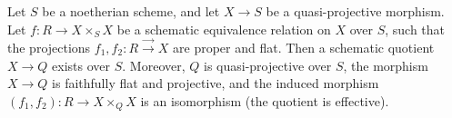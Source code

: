 \begin{theorem}\label{nhq-projective-flat-quotient}
Let $S$ be a noetherian scheme, and let
$X\to S$ be a quasi-projective morphism.
Let $f : R \to X\times_SX$ be a schematic
equivalence relation on $X$ over $S$, such that
the projections $f_1,f_2 : R \stackrel{\to}{\scriptstyle\to} X$
are proper and flat.
Then a schematic quotient $X\to Q$ exists over $S$.
Moreover, $Q$ is quasi-projective over $S$,
the morphism $X \to Q$ is faithfully flat and projective, and
the induced morphism $(f_1,f_2) : R\to X\times_QX$ is an isomorphism (the
quotient is effective).
\end{theorem}


